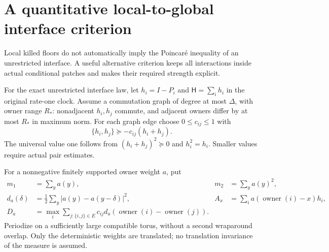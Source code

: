 \documentclass[11pt,oneside,openany]{book}
\theoremstyle{definition}
\theoremstyle{remark}
\begin{document}
\section{A quantitative local-to-global interface criterion}
\label{sec:weighted-patch-criterion}
Local killed floors do not automatically imply the Poincar\'e
inequality of an unrestricted interface. A useful alternative
criterion keeps all interactions inside actual conditional patches
and makes their required strength explicit.

For the exact unrestricted interface law, let
$h_i=I-P_i$ and $\mathsf H=\sum_i h_i$ in the original rate-one clock.
Assume a commutation graph of degree at most $\Delta$, with owner
range $R_*$: nonadjacent $h_i,h_j$ commute, and adjacent owners differ
by at most $R_*$ in maximum norm. For each graph edge choose
$0\le c_{ij}\le1$ with
\[
 \{h_i,h_j\}\succeq-c_{ij}(h_i+h_j).
\]
The universal value one follows from $(h_i+h_j)^2\succeq0$ and
$h_i^2=h_i$. Smaller values require actual pair estimates.

For a nonnegative finitely supported owner weight $a$, put
\begin{align*}
 m_1&=\sum_y a(y),&m_2&=\sum_y a(y)^2,\\
 d_a(\delta)&=\tfrac12\sum_y|a(y)-a(y-\delta)|^2,
 & A_x&=\sum_i a(\operatorname{owner}(i)-x)h_i,\\
 D_a&=\max_i\sum_{j:\{i,j\}\in E}c_{ij}
               d_a(\operatorname{owner}(i)-\operatorname{owner}(j)).
\end{align*}
Periodize on a sufficiently large compatible torus, without a second
wraparound overlap. Only the deterministic weights are translated;
no translation invariance of the measure is assumed.
\end{document}
